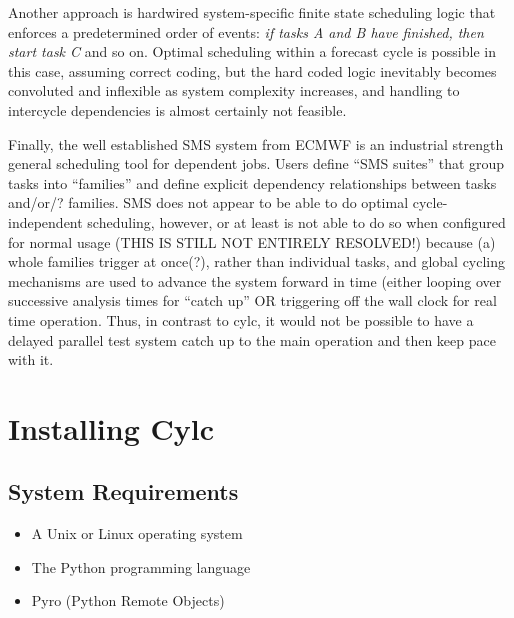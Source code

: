 \documentclass[11pt,a4paper]{article}
\begin{document}
Another approach is hardwired system-specific finite state scheduling
logic that enforces a predetermined order of events: {\em if tasks A and
B have finished, then start task C} and so on. Optimal scheduling within
a forecast cycle is possible in this case, assuming correct coding, but
the hard coded logic inevitably becomes convoluted and inflexible as
system complexity increases, and handling to intercycle dependencies is
almost certainly not feasible.  

Finally, the well established SMS system from ECMWF is an industrial
strength general scheduling tool for dependent jobs. Users define ``SMS
suites'' that group tasks into ``families'' and define explicit
dependency relationships between tasks and/or/? families. SMS does not
appear to be able to do optimal cycle-independent scheduling, however,
or at least is not able to do so when configured for normal usage (THIS
IS STILL NOT ENTIRELY RESOLVED!) because (a) whole families trigger 
at once(?), rather than individual tasks, and global cycling mechanisms
are used to advance the system forward in time (either looping
over successive analysis times for ``catch up'' OR triggering off the
wall clock for real time operation. Thus, in contrast to cylc, it would
not be possible to have a delayed parallel test system catch up to the
main operation and then keep pace with it.




\pagebreak
\section{Installing Cylc}
\label{sec:usage}

\subsection{System Requirements}

\begin{itemize}
    \item A Unix or Linux operating system
    \item The Python programming language
    \item Pyro (Python Remote Objects)
\end{itemize}
\end{document}
